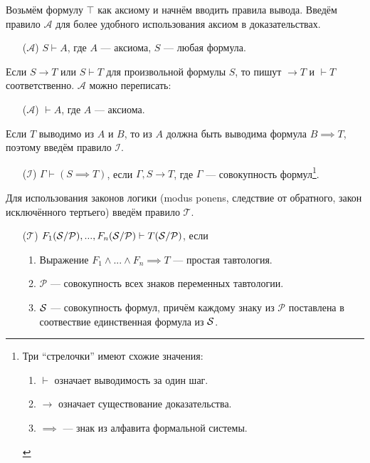 \newcommand\taut{$\mathcal T$}
\newcommand\axiom{$\mathcal A$}
\newcommand\implic{$\mathcal I$}
\newcommand\Px{\mathcal P}
Возьмём формулу $\top$ как аксиому и начнём вводить правила вывода.
Введём правило \axiom{} для более удобного использования аксиом в доказательствах.
\begin{enumerate}
	\item[(\axiom)]{}$S\vdash A$, где $A$ --- аксиома, $S$ --- любая формула.
\end{enumerate}

Если $S\to T$ или $S\vdash T$ для произвольной формулы $S$,
то пишут $\to T$ и $\vdash T$ соответственно. \axiom{} можно переписать:
\begin{enumerate}
	\item[(\axiom)]{}$\vdash A$, где $A$ --- аксиома.
\end{enumerate}

Если $T$ выводимо из $A$ и $B$, то из $A$ должна быть выводима формула $B\implies T$,
поэтому введём правило \implic{}.
\begin{enumerate}
	\item[(\implic)]{}${\Gamma\vdash (S\implies T)}$, если $\Gamma,S\to T$,
	где $\Gamma$ --- совокупность формул\footnote[][-2cm]{
		Три ``стрелочки'' имеют схожие значения:
		\begin{enumerate}
			\item{}$\vdash$ означает выводимость за один шаг.
			\item{}$\to$ означает существование доказательства.
			\item{}$\implies$ --- знак из алфавита формальной системы.
		\end{enumerate}
	}.
\end{enumerate}

Для использования законов логики (modus ponens, следствие от обратного, закон
исключённого тертьего) введём правило \taut{}.
\begin{enumerate}
	\item[(\taut)]{}$F_1(\Sx/\Px),...,F_n(\Sx/\Px)\vdash T(\Sx/\Px)$, если
	\begin{enumerate}
		\item{}Выражение ${F_1\land...\land F_n\implies T}$ --- простая тавтология.
		\item{}$\Px$ --- совокупность всех знаков переменных тавтологии.
		\item{}$\mathcal S$ --- совокупность формул, причём каждому знаку из $\Px$
		поставлена в соотвествие единственная формула из $\mathcal S$.
	\end{enumerate}
\end{enumerate}

